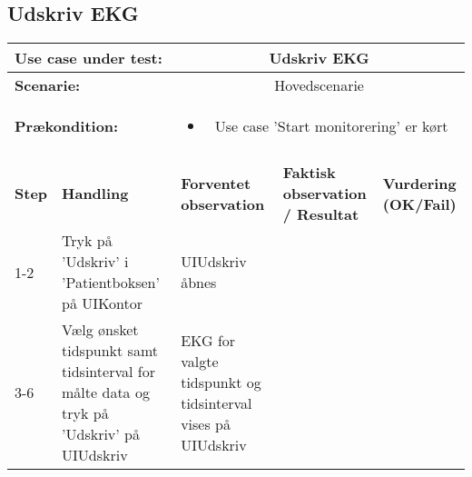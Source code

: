 \subsection{Udskriv EKG}
\begin{tabular}{|p{1cm}|p{3cm}|p{4cm}|p{4cm}|p{2cm}|}
\hline
\multicolumn{2}{|p{4cm}|}{\textbf{Use case under test:}} & \multicolumn{3}{c|}{Udskriv EKG} \\\hline

\multicolumn{2}{|p{3cm}|}{\textbf{Scenarie:}} & \multicolumn{3}{c|}{Hovedscenarie} \\\hline

\multicolumn{2}{|p{3cm}|}{\textbf{Prækondition:}}  & \multicolumn{3}{c|}{\parbox{0.8\textwidth}{
\begin{itemize}[label=$\circ$]
\item Use case 'Start monitorering' er kørt 
\end{itemize} }}\\\hline

\multicolumn{5}{|c|}{} \\\hline

\textbf{Step} & \textbf{Handling} & \textbf{Forventet observation} & \textbf{Faktisk observation / Resultat} & \textbf{Vurdering (OK/Fail)}\\\hline

1-2 & Tryk på 'Udskriv' i 'Patientboksen' på UIKontor & UIUdskriv åbnes & & \\\hline

3-6 & Vælg ønsket tidspunkt samt tidsinterval for målte data og tryk på 'Udskriv' på UIUdskriv & EKG for valgte tidspunkt og tidsinterval vises på UIUdskriv & & \\\hline

\end{tabular}
\\

